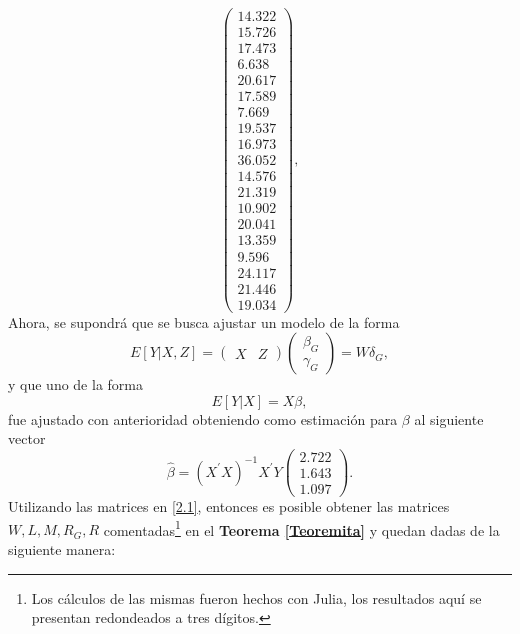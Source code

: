 \documentclass[10.5pt,notitlepage]{article}
\theoremstyle{plain}
\begin{document}
\begin{equation}
\begin{pmatrix}
 14.322\\
 15.726\\
 17.473\\
  6.638\\
 20.617\\
 17.589\\
  7.669\\
 19.537\\
 16.973\\
 36.052\\
 14.576\\
 21.319\\
 10.902\\
 20.041\\
 13.359\\
  9.596\\
 24.117\\
 21.446\\
 19.034
\end{pmatrix},
\end{equation}
Ahora, se supondrá que se busca ajustar un modelo de la forma 
\begin{equation}\label{2.2}
    E[Y|X,Z] = \begin{pmatrix}
    X & Z
    \end{pmatrix}
    \begin{pmatrix}
    \beta_{G} \\
    \gamma_{G}
    \end{pmatrix} = W \delta_{G}, 
\end{equation}
y que uno de la forma 
\begin{equation}\label{2.3}
    E[Y|X] =  X \beta,
\end{equation}
fue ajustado con anterioridad obteniendo como estimación para \(\beta\) al siguiente vector 
\begin{equation}\label{2.4}
\hat{\beta}=(X^{'}X)^{-1}X^{'}Y \begin{pmatrix}
    2.722\\ 1.643\\ 1.097
    \end{pmatrix}.
\end{equation}
Utilizando las matrices en \eqref{2.1}, entonces es posible obtener las matrices \(W,L,M, R_{G},R\) comentadas\footnote{Los cálculos de las mismas fueron hechos con Julia, los resultados aquí se presentan redondeados a tres dígitos.} en el \textbf{Teorema \ref{Teoremita}} y quedan dadas de la siguiente manera: 
\end{document}
